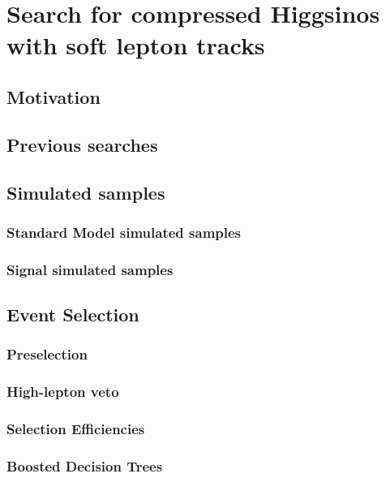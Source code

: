 \chapter{Search for compressed Higgsinos  with soft
lepton tracks}

\section{Motivation}

\section{Previous searches}




\section{Simulated samples}
\subsection{Standard Model simulated samples}
\label{sec:sm-mc}
\subsection{Signal simulated samples}
\label{signal-simulation}





\section{Event Selection}

\subsection{Preselection}
\subsection{High-\pt lepton veto}
\subsection{Selection Efficiencies}
\subsection{Boosted Decision Trees}


